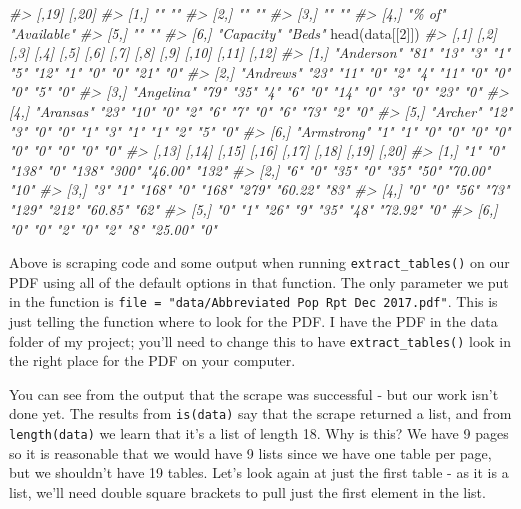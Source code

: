 \documentclass[
  12pt,
]{book}
\newenvironment{Shaded}{\begin{snugshade}}{\end{snugshade}}
\newcommand{\CommentTok}[1]{\textcolor[rgb]{0.37,0.37,0.37}{\textit{#1}}}
\newcommand{\DecValTok}[1]{\textcolor[rgb]{0.06,0.06,0.06}{#1}}
\newcommand{\FunctionTok}[1]{\textcolor[rgb]{0,0,0}{#1}}
\newcommand{\NormalTok}[1]{#1}
\begin{document}
\begin{Shaded}
\begin{Highlighting}[]
\CommentTok{\#\textgreater{}      [,19]      [,20]      }
\CommentTok{\#\textgreater{} [1,] ""         ""         }
\CommentTok{\#\textgreater{} [2,] ""         ""         }
\CommentTok{\#\textgreater{} [3,] ""         ""         }
\CommentTok{\#\textgreater{} [4,] "\% of"     "Available"}
\CommentTok{\#\textgreater{} [5,] ""         ""         }
\CommentTok{\#\textgreater{} [6,] "Capacity" "Beds"}
\FunctionTok{head}\NormalTok{(data[[}\DecValTok{2}\NormalTok{]])}
\CommentTok{\#\textgreater{}      [,1]        [,2] [,3] [,4] [,5] [,6] [,7] [,8] [,9] [,10] [,11] [,12]}
\CommentTok{\#\textgreater{} [1,] "Anderson"  "81" "13" "3"  "1"  "5"  "12" "1"  "0"  "0"   "21"  "0"  }
\CommentTok{\#\textgreater{} [2,] "Andrews"   "23" "11" "0"  "2"  "4"  "11" "0"  "0"  "0"   "5"   "0"  }
\CommentTok{\#\textgreater{} [3,] "Angelina"  "79" "35" "4"  "6"  "0"  "14" "0"  "3"  "0"   "23"  "0"  }
\CommentTok{\#\textgreater{} [4,] "Aransas"   "23" "10" "0"  "2"  "6"  "7"  "0"  "6"  "73"  "2"   "0"  }
\CommentTok{\#\textgreater{} [5,] "Archer"    "12" "3"  "0"  "0"  "1"  "3"  "1"  "1"  "2"   "5"   "0"  }
\CommentTok{\#\textgreater{} [6,] "Armstrong" "1"  "1"  "0"  "0"  "0"  "0"  "0"  "0"  "0"   "0"   "0"  }
\CommentTok{\#\textgreater{}      [,13] [,14] [,15] [,16] [,17] [,18] [,19]   [,20]}
\CommentTok{\#\textgreater{} [1,] "1"   "0"   "138" "0"   "138" "300" "46.00" "132"}
\CommentTok{\#\textgreater{} [2,] "6"   "0"   "35"  "0"   "35"  "50"  "70.00" "10" }
\CommentTok{\#\textgreater{} [3,] "3"   "1"   "168" "0"   "168" "279" "60.22" "83" }
\CommentTok{\#\textgreater{} [4,] "0"   "0"   "56"  "73"  "129" "212" "60.85" "62" }
\CommentTok{\#\textgreater{} [5,] "0"   "1"   "26"  "9"   "35"  "48"  "72.92" "0"  }
\CommentTok{\#\textgreater{} [6,] "0"   "0"   "2"   "0"   "2"   "8"   "25.00" "0"}
\end{Highlighting}
\end{Shaded}

Above is scraping code and some output when running \texttt{extract\_tables()} on our PDF using all of the default options in that function. The only parameter we put in the function is \texttt{file\ =\ "data/Abbreviated\ Pop\ Rpt\ Dec\ 2017.pdf"}. This is just telling the function where to look for the PDF. I have the PDF in the data folder of my project; you'll need to change this to have \texttt{extract\_tables()} look in the right place for the PDF on your computer.

You can see from the output that the scrape was successful - but our work isn't done yet. The results from \texttt{is(data)} say that the scrape returned a list, and from \texttt{length(data)} we learn that it's a list of length 18. Why is this? We have 9 pages so it is reasonable that we would have 9 lists since we have one table per page, but we shouldn't have 19 tables. Let's look again at just the first table - as it is a list, we'll need double square brackets to pull just the first element in the list.
\end{document}
